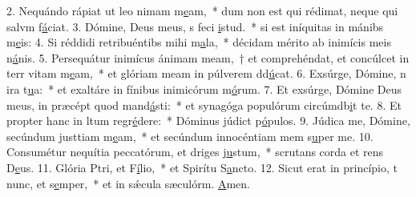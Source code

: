 2. Nequándo rápiat ut leo nimam m\uline{e}am,~* dum non est qui rédimat, neque qui salvm f\uline{á}ciat.
3. Dómine, Deus meus, s feci \uline{i}stud.~* si est iníquitas in mánibs m\uline{e}is:
4. Si réddidi retribuéntibs mihi m\uline{a}la,~* décidam mérito ab inimícis meis n\uline{á}nis.
5. Persequátur inimícus ánimam meam,~† et comprehéndat, et concúlcet in terr vitam m\uline{e}am,~* et glóriam meam in púlverem dd\uline{ú}cat.
6. Exsúrge, Dómine, n ira t\uline{u}a:~* et exaltáre in fínibus inimicórum m\uline{ó}rum.
7. Et exsúrge, Dómine Deus meus, in præcépt quod mand\uline{á}sti:~* et synagóga populórum circúmdb\uline{i}t te.
8. Et propter hanc in ltum regr\uline{é}dere:~* Dóminus júdict p\uline{ó}pulos.
9. Júdica me, Dómine, secúndum justtiam m\uline{e}am,~* et secúndum innocéntiam mem s\uline{u}per me.
10. Consumétur nequítia peccatórum, et driges j\uline{u}stum,~* scrutans corda et rens D\uline{e}us.
11. Glória Ptri, et F\uline{í}lio,~* et Spirítu S\uline{a}ncto.
12. Sicut erat in princípio, t nunc, et s\uline{e}mper,~* et in sǽcula sæculórm. \uline{A}men.
